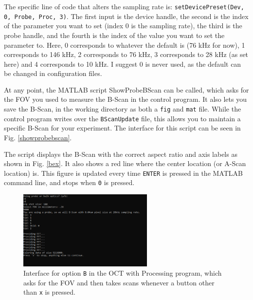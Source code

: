 \documentclass{article}
\begin{document}
\par{The specific line of code that alters the sampling rate is: \texttt{setDevicePreset(Dev, 0, Probe, Proc, 3)}. The first input is the device handle, the second is the index of the parameter you want to set (index 0 is the sampling rate), the third is the probe handle, and the fourth is the index of the value you want to set the parameter to. Here, 0 corresponds to whatever the default is (76 kHz for now), 1 corresponds to 146 kHz, 2 corresponds to 76 kHz, 3 corresponds to 28 kHz (as set here) and 4 corresponds to 10 kHz. I suggest 0 is never used, as the default can be changed in configuration files.}

\par{At any point, the MATLAB script ShowProbeBScan can be called, which asks for the FOV you used to measure the B-Scan in the control program. It also lets you save the B-Scan, in the working directory as both a \texttt{fig} and \texttt{mat} file. While the control program writes over the \texttt{BScanUpdate} file, this allows you to maintain a specific B-Scan for your experiment. The interface for this script can be seen in Fig. \ref{showprobebscan}.}

\par{The script displays the B-Scan with the correct aspect ratio and axis labels as shown in Fig. \ref{bex}. It also shows a red line where the center location (or A-Scan location) is. This figure is updated every time \texttt{ENTER} is pressed in the MATLAB command line, and stops when \texttt{0} is pressed.}

\begin{figure}[!h]\label{optionb}
	\centering
	\includegraphics[width=0.6\textwidth]{Data for Probe Writeup/BMode Probe.png}
	\caption{Interface for option \texttt{B} in the OCT with Processing program, which asks for the FOV and then takes scans whenever a button other than \texttt{x} is pressed.}
\end{figure}
\end{document}
